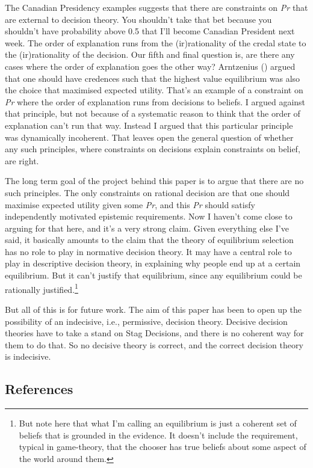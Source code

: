 \documentclass[
  10pt,
  letterpaper,
  DIV=11,
  numbers=noendperiod,
  twoside]{scrartcl}
\begin{document}
The Canadian Presidency examples suggests that there are constraints on
\emph{Pr} that are external to decision theory. You shouldn't take that
bet because you shouldn't have probability above 0.5 that I'll become
Canadian President next week. The order of explanation runs from the
(ir)rationality of the credal state to the (ir)rationality of the
decision. Our fifth and final question is, are there any cases where the
order of explanation goes the other way? Arntzenius
() argued that one should have
credences such that the highest value equilibrium was also the choice
that maximised expected utility. That's an example of a constraint on
\emph{Pr} where the order of explanation runs from decisions to beliefs.
I argued against that principle, but not because of a systematic reason
to think that the order of explanation can't run that way. Instead I
argued that this particular principle was dynamically incoherent. That
leaves open the general question of whether any such principles, where
constraints on decisions explain constraints on belief, are right.

The long term goal of the project behind this paper is to argue that
there are no such principles. The only constraints on rational decision
are that one should maximise expected utility given some \emph{Pr}, and
this \emph{Pr} should satisfy independently motivated epistemic
requirements. Now I haven't come close to arguing for that here, and
it's a very strong claim. Given everything else I've said, it basically
amounts to the claim that the theory of equilibrium selection has no
role to play in normative decision theory. It may have a central role to
play in descriptive decision theory, in explaining why people end up at
a certain equilibrium. But it can't justify that equilibrium, since any
equilibrium could be rationally justified.\footnote{But note here that
  what I'm calling an equilibrium is just a coherent set of beliefs that
  is grounded in the evidence. It doesn't include the requirement,
  typical in game-theory, that the chooser has true beliefs about some
  aspect of the world around them.}

But all of this is for future work. The aim of this paper has been to
open up the possibility of an indecisive, i.e., permissive, decision
theory. Decisive decision theories have to take a stand on Stag
Decisions, and there is no coherent way for them to do that. So no
decisive theory is correct, and the correct decision theory is
indecisive.

\subsection*{References}\label{references}
\end{document}
